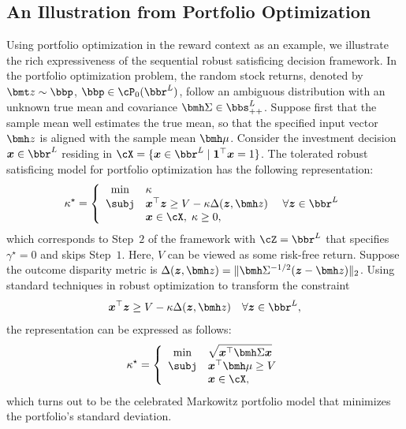 \documentclass[mnsc, nonblindrev]{informswp}
\newcommand{\1}[1]{\mathds{1}{\left(#1\right)}}
\begin{document}
\subsection*{An Illustration from Portfolio Optimization}

Using portfolio optimization in the reward context as an example, we illustrate the rich expressiveness of the sequential robust satisficing decision framework. In the portfolio optimization problem, the random stock returns, denoted by $\bmt z \sim \bbp$, $\bbp \in \cP_0(\bbr^L)$, follow an ambiguous distribution with an unknown true mean and covariance $\bmh \Sigma \in \bbs^L_{++}$. Suppose first that the sample mean well estimates the true mean, so that the specified input vector $\bmh z$ is aligned with the sample mean $\bmh \mu$. Consider the investment decision $\bm x \in \bbr^L$ residing in $\cX = \{\bm x \in \bbr^L \;|\; \bm 1 ^\top \bm x = 1\}$. The tolerated robust satisficing model for portfolio optimization has the following representation:
$$
\kappa^\star = \left\{
\begin{array}{cll}
\min & \kappa \\
\subj& \bm x^\top \bm z  \geq V - \kappa \Delta(\bm z,\bmh z) &~\forall \bm z \in \bbr^L \\
& \bm x \in \cX, \; \kappa \geq 0,
\end{array}
\right.
$$
which corresponds to Step~$2$ of the framework with $\cZ = \bbr^L$ that specifies $\gamma^\star = 0$ and skips Step~$1$. Here, $V$ can be viewed as some risk-free return. Suppose the outcome disparity metric is $\Delta(\bm z, \bmh z) = \|\bmh \Sigma^{-1/2}(\bm z - \bmh z)\|_2$. Using standard techniques in robust optimization to transform the constraint
\[
\bm x^\top \bm z  \geq V - \kappa \Delta(\bm z,\bmh z) ~~~\forall \bm z \in \bbr^L,
\]
the representation can be expressed as follows:
\begin{equation}
\label{mod:MinStdProblem}    
\kappa^\star = \left\{ 
\begin{array}{cll}
\min & \displaystyle \sqrt{\bm x^\top \bmh \Sigma \bm x} \\
\subj& \bm x^\top \bmh \mu \geq V \\
& \bm x \in \cX,
\end{array}
\right.
\end{equation}
which turns out to be the celebrated Markowitz portfolio model that minimizes the portfolio's standard deviation.
\end{document}
